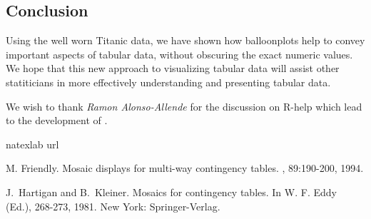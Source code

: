 \documentclass[a4paper]{report}
\begin{document}
\begin{article}
\section*{Conclusion}

Using the well worn Titanic data, we have shown how balloonplots
help to convey important aspects of tabular data, without obscuring
the exact numeric values. We hope that this new approach to
visualizing tabular data will assist other statiticians in more
effectively understanding and presenting tabular data.

We wish to thank \emph{Ramon Alonso-Allende}
 for the discussion on R-help which lead
to the development of .

\address{Gregory R. Warnes, Pfizer Inc., USA\\
\\
       Nitin Jain, Pfizer Inc., USA\\
}

\begin{thebibliography}{99}
\expandafter\ifx\csname natexlab\endcsname\relax\def\natexlab#1{#1}\fi
\expandafter\ifx\csname url\endcsname\relax
  \def\url#1{{\tt #1}}\fi


M. Friendly. 
Mosaic displays for multi-way contingency tables.
, 89:190-200, 1994.

J.\ Hartigan and B.\ Kleiner. 
\newblock Mosaics for contingency tables.
In W. F. Eddy (Ed.), 
268-273, 1981. New
York: Springer-Verlag. 


\end{thebibliography}


\end{article}
\end{document}
